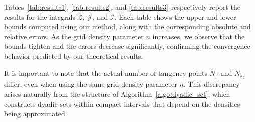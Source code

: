 \documentclass[review]{elsarticle}
\begin{document}

\begin{table}[H]
\centering
{}
\caption{Values of $\mathcal{I}$ and their absolute error and relative error for each tangency point}
\label{tab:results3}
\end{table}

Tables~\ref{tab:results1}, \ref{tab:results2}, and \ref{tab:results3} respectively report the results for the integrals $\mathcal{Z}$, $\mathcal{J}$, and $\mathcal{I}$. Each table shows the upper and lower bounds computed using our method, along with the corresponding absolute and relative errors. As the grid density parameter $n$ increases, we observe that the bounds tighten and the errors decrease significantly, confirming the convergence behavior predicted by our theoretical results.


It is important to note that the actual number of tangency points $N_\pi$ and $N_{\pi_q}$ differ, even when using the same grid density parameter $n$. This discrepancy arises naturally from the structure of Algorithm~\ref{algo:dyadic_set}, which constructs dyadic sets within compact intervals that depend on the densities being approximated.



\end{document}
